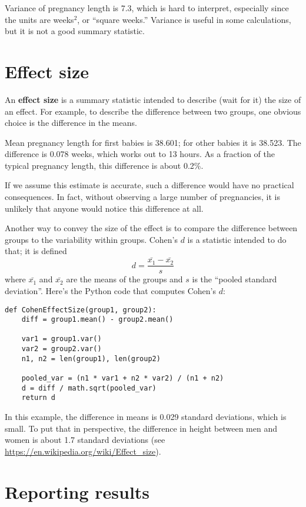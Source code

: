 Variance of pregnancy length is 7.3, which is hard to interpret,
especially since the units are weeks$^2$, or ``square weeks.''
Variance is useful in some calculations, but it is not
a good summary statistic.


\section{Effect size}

An {\bf effect size} is a summary statistic intended to describe (wait
for it) the size of an effect.  For example, to describe the
difference between two groups, one obvious choice is the difference in
the means.  

Mean pregnancy length for first babies is 38.601; for
other babies it is 38.523.  The difference is 0.078 weeks, which works
out to 13 hours.  As a fraction of the typical pregnancy length, this
difference is about 0.2\%.

If we assume this estimate is accurate, such a difference
would have no practical consequences.  In fact, without
observing a large number of pregnancies, it is unlikely that anyone
would notice this difference at all.

Another way to convey the size of the effect is to compare the
difference between groups to the variability within groups.
Cohen's $d$ is a statistic intended to do that; it is defined
%
\[ d = \frac{\bar{x_1} - \bar{x_2}}{s}  \]
%
where $\bar{x_1}$ and $\bar{x_2}$ are the means of the groups and
$s$ is the ``pooled standard deviation''.  Here's the Python
code that computes Cohen's $d$:

\begin{verbatim}
def CohenEffectSize(group1, group2):
    diff = group1.mean() - group2.mean()

    var1 = group1.var()
    var2 = group2.var()
    n1, n2 = len(group1), len(group2)

    pooled_var = (n1 * var1 + n2 * var2) / (n1 + n2)
    d = diff / math.sqrt(pooled_var)
    return d
\end{verbatim}

In this example, the difference in means is 0.029 standard deviations,
which is small.  To put that in perspective, the difference in
height between men and women is about 1.7 standard deviations (see
\url{https://en.wikipedia.org/wiki/Effect_size}).


\section{Reporting results}

